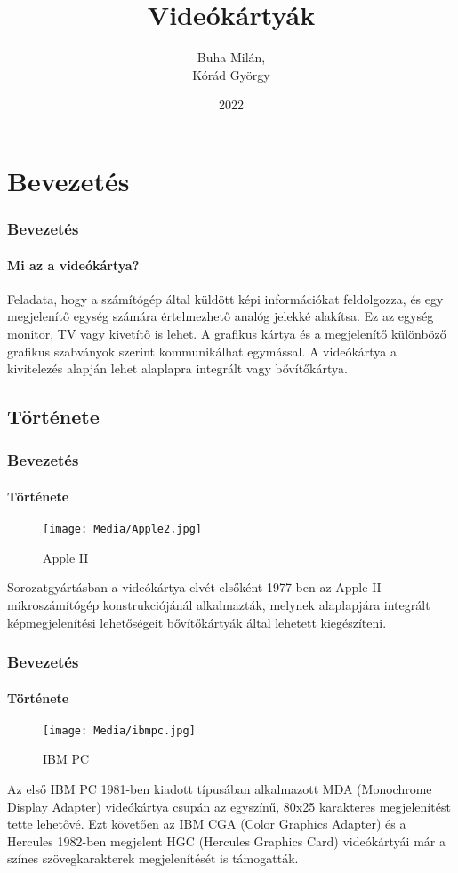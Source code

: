 \documentclass{beamer}
\title{Videókártyák}
\author{Buha Milán, \\Kórád György}
\date{2022}
\begin{document}
\frame{\titlepage}
\frame{\tableofcontents}

\section{Bevezetés}
\begin{frame}
\frametitle{Bevezetés}
\framesubtitle{Mi az a videókártya?}
Feladata, hogy a számítógép által küldött képi információkat feldolgozza, és egy megjelenítő egység számára értelmezhető analóg jelekké alakítsa. Ez az egység monitor, TV vagy kivetítő is lehet. A grafikus kártya és a megjelenítő különböző grafikus szabványok szerint kommunikálhat egymással. A videókártya a kivitelezés alapján lehet alaplapra integrált vagy bővítőkártya.
\end{frame}

\subsection{Története}
\begin{frame}
\frametitle{Bevezetés}
\framesubtitle{Története}
\begin{wrapfigure}{r}{0.3\textwidth}
    \centering
    \texttt{[image: Media/Apple2.jpg]}
    \caption{Apple II}
\end{wrapfigure}

Sorozatgyártásban a videókártya elvét elsőként 1977-ben az Apple II mikroszámítógép konstrukciójánál alkalmazták, melynek alaplapjára integrált képmegjelenítési lehetőségeit bővítőkártyák által lehetett kiegészíteni.
\end{frame}

\begin{frame}
\frametitle{Bevezetés}
\framesubtitle{Története}
\begin{wrapfigure}{r}{0.3\textwidth}
    \centering
    \texttt{[image: Media/ibmpc.jpg]}
    \caption{IBM PC}
\end{wrapfigure}

Az első IBM PC 1981-ben kiadott típusában alkalmazott MDA (Monochrome Display Adapter) videókártya csupán az egyszínű, 80x25 karakteres megjelenítést tette lehetővé. Ezt követően az IBM CGA (Color Graphics Adapter) és a Hercules 1982-ben megjelent HGC (Hercules Graphics Card) videókártyái már a színes szövegkarakterek megjelenítését is támogatták.

\end{frame}
\end{document}
